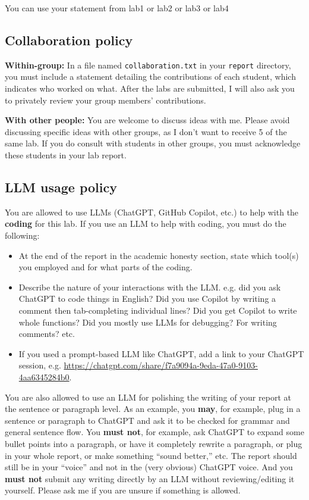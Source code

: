 \documentclass[letterpaper,12pt]{article}
\begin{document}
You can use your statement from lab1 or lab2 or lab3 or lab4

\subsection{Collaboration policy}

\textbf{Within-group:} In a file named \texttt{collaboration.txt} in your \texttt{report} directory, you must include a statement detailing the contributions of each student, which indicates who worked on what. After the labs are submitted, I will also ask you to privately review your group members' contributions.

\textbf{With other people:} You are welcome to discuss ideas with me. Please avoid discussing specific ideas with other groups, as I don't want to receive 5 of the same lab. If you do consult with students in other groups, you must acknowledge these students in your lab report.

\subsection{LLM usage policy}

You are allowed to use LLMs (ChatGPT, GitHub Copilot, etc.) to help with the \textbf{coding} for this lab.  If you use an LLM to help with coding, you must do the following:
\begin{itemize}
    \item At the end of the report in the academic honesty section, state which tool(s) you employed and for what parts of the coding.
    \item Describe the nature of your interactions with the LLM. e.g. did you ask ChatGPT to code things in English? Did you use Copilot by writing a comment then tab-completing individual lines? Did you get Copilot to write whole functions? Did you mostly use LLMs for debugging? For writing comments? etc.
    \item If you used a prompt-based LLM like ChatGPT, add a link to your ChatGPT session, e.g. \url{https://chatgpt.com/share/f7a9094a-9eda-47a0-9103-4aa6345284b0}.
\end{itemize}

You are also allowed to use an LLM for polishing the writing of your report at the sentence or paragraph level. As an example, you \textbf{may}, for example, plug in a sentence or paragraph to ChatGPT and ask it to be checked for grammar and general sentence flow. You \textbf{must not}, for example, ask ChatGPT to expand some bullet points into a paragraph, or have it completely rewrite a paragraph, or plug in your whole report, or make something ``sound better,'' etc. The report should still be in your ``voice'' and not in the (very obvious) ChatGPT voice. And you \textbf{must not} submit any writing directly by an LLM without reviewing/editing it yourself. Please ask me if you are unsure if something is allowed.
\end{document}
